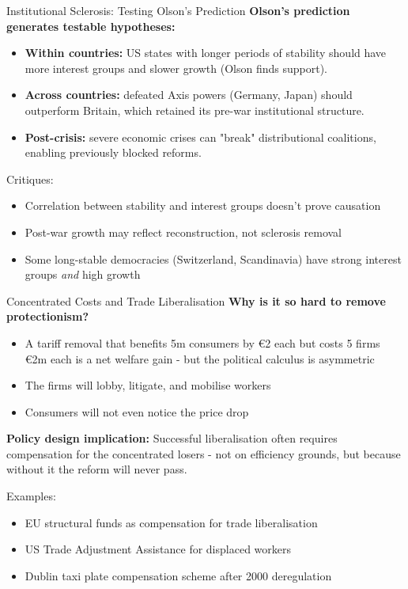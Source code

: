 \documentclass[10pt]{beamer}
\begin{document}
\begin{frame}{Institutional Sclerosis: Testing Olson's Prediction}
\textbf{Olson's prediction generates testable hypotheses:}

\vspace{0.1cm}
\begin{itemize}
\item \textbf{Within countries:} US states with longer periods of stability should have more interest groups and slower growth (Olson finds support).
\item \textbf{Across countries:} defeated Axis powers (Germany, Japan) should outperform Britain, which retained its pre-war institutional structure.
\item \textbf{Post-crisis:} severe economic crises can "break" distributional coalitions, enabling previously blocked reforms.
\end{itemize}

\vspace{0.1cm}
\alert{Critiques:}
\begin{itemize}
\item Correlation between stability and interest groups doesn't prove causation
\item Post-war growth may reflect reconstruction, not sclerosis removal
\item Some long-stable democracies (Switzerland, Scandinavia) have strong interest groups \emph{and} high growth
\end{itemize}
\end{frame}


\begin{frame}{Concentrated Costs and Trade Liberalisation}
\textbf{Why is it so hard to remove protectionism?}

\vspace{0.1cm}
\begin{itemize}
\item A tariff removal that benefits 5m consumers by \euro 2 each but costs 5 firms \euro 2m each is a net welfare gain - but the \alert{political calculus} is asymmetric
\item The firms will lobby, litigate, and mobilise workers
\item Consumers will not even notice the price drop
\end{itemize}

\vspace{0.1cm}
\textbf{Policy design implication:}
Successful liberalisation often requires \alert{compensation} for the concentrated losers - not on efficiency grounds, but because without it the reform will never pass.

\vspace{0.1cm}
\alert{Examples:}
\begin{itemize}
\item EU structural funds as compensation for trade liberalisation
\item US Trade Adjustment Assistance for displaced workers
\item Dublin taxi plate compensation scheme after 2000 deregulation
\end{itemize}
\end{frame}
\end{document}
